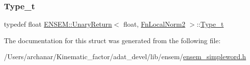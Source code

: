 \mbox{\label{structENSEM_1_1UnaryReturn_3_01float_00_01FnLocalNorm2_01_4_ae3f20d3aa61a3012baf0d735dd9441d8}} 
\subsubsection{\texorpdfstring{Type\_t}{Type\_t}\hspace{0.1cm}{\footnotesize\ttfamily [2/2]}}
{\footnotesize\ttfamily typedef float \mbox{\hyperlink{structENSEM_1_1UnaryReturn}{E\+N\+S\+E\+M\+::\+Unary\+Return}}$<$ float, \mbox{\hyperlink{structENSEM_1_1FnLocalNorm2}{Fn\+Local\+Norm2}} $>$\+::\mbox{\hyperlink{structENSEM_1_1UnaryReturn_3_01float_00_01FnLocalNorm2_01_4_ae3f20d3aa61a3012baf0d735dd9441d8}{Type\+\_\+t}}}



The documentation for this struct was generated from the following file\+:\begin{DoxyCompactItemize}
\item 
/\+Users/archanar/\+Kinematic\+\_\+factor/adat\+\_\+devel/lib/ensem/\mbox{\hyperlink{lib_2ensem_2ensem__simpleword_8h}{ensem\+\_\+simpleword.\+h}}\end{DoxyCompactItemize}
